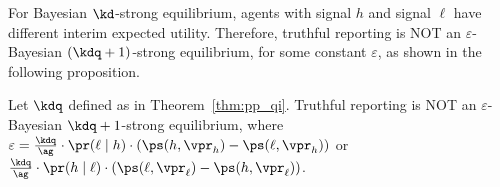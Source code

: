 For Bayesian $\kd$-strong equilibrium, agents with signal $h$ and signal $\ell$ have different interim expected utility. Therefore, truthful reporting is NOT an $\varepsilon$-Bayesian $(\kdq + 1)$-strong equilibrium, for some constant $\varepsilon$, as shown in the following proposition. 

\begin{prop}
    Let $\kdq$ defined as in Theorem~\ref{thm:pp_qi}. Truthful reporting is NOT an $\varepsilon$-Bayesian $\kdq + 1$-strong equilibrium, where $\varepsilon = \frac{\kdq}{\ag}\cdot \pr(\ell \mid h) \cdot (\ps(h, \vpr_h) - \ps(\ell, \vpr_h))$ or $\frac{\kdq}{\ag}\cdot \pr(h \mid \ell) \cdot  (\ps(\ell, \vpr_\ell) - \ps(h, \vpr_\ell))$. 
\end{prop}




